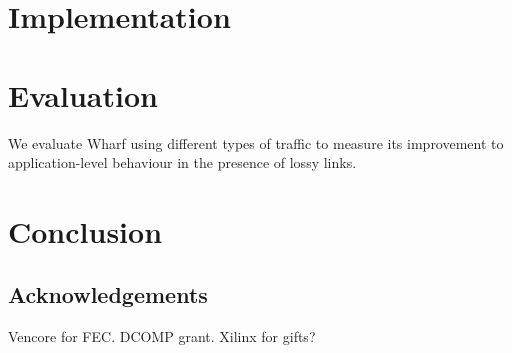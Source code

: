\documentclass[sigconf]{acmart}
\newcommand{\OurSys}{Wharf\xspace}
\begin{document}
\section{Implementation}
\label{sec:implementation}
\section{Evaluation}
We evaluate \OurSys using different types of traffic to measure its improvement
to application-level behaviour in the presence of lossy links.


\section{Conclusion}

\subsection*{Acknowledgements}
Vencore for FEC.
DCOMP grant.
Xilinx for gifts?



\end{document}
